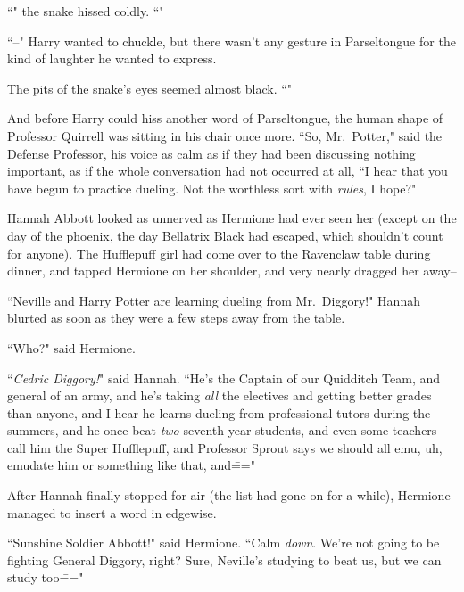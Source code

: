 ``" the snake hissed coldly. ``"

``\---" Harry wanted to chuckle, but there wasn't any gesture in Parseltongue for the kind of laughter he wanted to express.

The pits of the snake's eyes seemed almost black. ``"

And before Harry could hiss another word of Parseltongue, the human shape of Professor Quirrell was sitting in his chair once more. ``So, Mr.~Potter," said the Defense Professor, his voice as calm as if they had been discussing nothing important, as if the whole conversation had not occurred at all, ``I hear that you have begun to practice dueling. Not the worthless sort with \emph{rules}, I hope?"

\later

Hannah Abbott looked as unnerved as Hermione had ever seen her (except on the day of the phoenix, the day Bellatrix Black had escaped, which shouldn't count for anyone). The Hufflepuff girl had come over to the Ravenclaw table during dinner, and tapped Hermione on her shoulder, and very nearly dragged her away\---

``Neville and Harry Potter are learning dueling from Mr.~Diggory!" Hannah blurted as soon as they were a few steps away from the table.

``Who?" said Hermione.

``\emph{Cedric Diggory!}" said Hannah. ``He's the Captain of our Quidditch Team, and general of an army, and he's taking \emph{all} the electives and getting better grades than anyone, and I hear he learns dueling from professional tutors during the summers, and he once beat \emph{two} seventh-year students, and even some teachers call him the Super Hufflepuff, and Professor Sprout says we should all emu, uh, emudate him or something like that, and\==="

After Hannah finally stopped for air (the list had gone on for a while), Hermione managed to insert a word in edgewise.

``Sunshine Soldier Abbott!" said Hermione. ``Calm \emph{down}. We're not going to be fighting General Diggory, right? Sure, Neville's studying to beat us, but we can study too\==="

